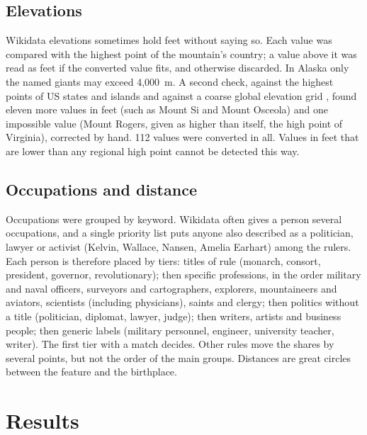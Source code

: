 \documentclass[11pt,a4paper]{article}
\begin{document}
\subsection{Elevations}
Wikidata elevations sometimes hold feet without saying so. Each value was compared with the highest point of the mountain's country; a value above it was read as feet if the converted value fits, and otherwise discarded. In Alaska only the named giants may exceed 4,000~m. A second check, against the highest points of US states and islands and against a coarse global elevation grid \citep{etopo5}, found eleven more values in feet (such as Mount Si and Mount Osceola) and one impossible value (Mount Rogers, given as higher than itself, the high point of Virginia), corrected by hand. 112 values were converted in all. Values in feet that are lower than any regional high point cannot be detected this way.

\subsection{Occupations and distance}
Occupations were grouped by keyword. Wikidata often gives a person several occupations, and a single priority list puts anyone also described as a politician, lawyer or activist (Kelvin, Wallace, Nansen, Amelia Earhart) among the rulers. Each person is therefore placed by tiers: titles of rule (monarch, consort, president, governor, revolutionary); then specific professions, in the order military and naval officers, surveyors and cartographers, explorers, mountaineers and aviators, scientists (including physicians), saints and clergy; then politics without a title (politician, diplomat, lawyer, judge); then writers, artists and business people; then generic labels (military personnel, engineer, university teacher, writer). The first tier with a match decides. Other rules move the shares by several points, but not the order of the main groups. Distances are great circles between the feature and the birthplace.

\section{Results}
\end{document}
